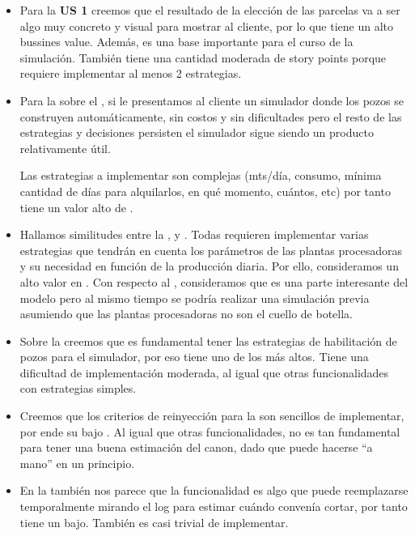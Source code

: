 \begin{itemize}
  \item Para la \textbf{US 1} creemos que el resultado de la elección de las parcelas va a ser algo muy concreto y visual para mostrar al cliente, por lo que tiene un alto bussines value. Además, es una base importante para el curso de la simulación.
  También tiene una cantidad moderada de story points porque requiere implementar al menos 2 estrategias. 
	
    \item Para la  sobre el \BV, si le presentamos al cliente un simulador donde los pozos se construyen automáticamente, sin costos y sin dificultades pero el resto de las estrategias y decisiones persisten el simulador sigue siendo un producto relativamente útil.

	Las estrategias a implementar son complejas (mts/día, consumo, mínima cantidad de días para alquilarlos, en qué momento, cuántos, etc) por tanto tiene 
    un valor alto de \SP. 
    
	\item Hallamos similitudes entre la ,  y . Todas requieren implementar varias estrategias que tendrán en cuenta los parámetros de las plantas procesadoras y su necesidad en función de la producción diaria. Por ello, consideramos un alto valor en \SP. Con respecto al \BV, consideramos que es una parte interesante del modelo pero al mismo tiempo se podría realizar una simulación previa asumiendo que las plantas procesadoras no son el cuello de botella.
    
    \item Sobre la  creemos que es fundamental tener las estrategias de habilitación de pozos para el simulador, por eso tiene uno de los \BV{} más altos. Tiene una dificultad de implementación moderada, al igual que otras funcionalidades con estrategias simples. 
    
    \item Creemos que los criterios de reinyección para la  son sencillos 
    de implementar, por ende su bajo \SP. Al igual que otras funcionalidades, 
    no es tan fundamental para tener una buena estimación del canon, 
    dado que puede hacerse ``a mano'' en un principio. 
    
    \item En la  también nos parece que la funcionalidad es algo que puede reemplazarse temporalmente mirando el log para estimar cuándo convenía cortar, por tanto tiene un \BV{} bajo. También es casi trivial de implementar. 
    

\end{itemize}
